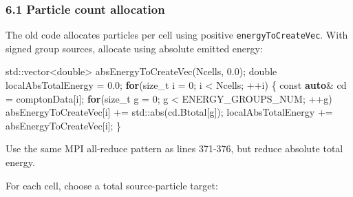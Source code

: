 \documentclass[
]{article}
\newenvironment{Shaded}{}{}
\newcommand{\AttributeTok}[1]{\textcolor[rgb]{0.49,0.56,0.16}{#1}}
\newcommand{\BuiltInTok}[1]{\textcolor[rgb]{0.00,0.50,0.00}{#1}}
\newcommand{\ControlFlowTok}[1]{\textcolor[rgb]{0.00,0.44,0.13}{\textbf{#1}}}
\newcommand{\DataTypeTok}[1]{\textcolor[rgb]{0.56,0.13,0.00}{#1}}
\newcommand{\DecValTok}[1]{\textcolor[rgb]{0.25,0.63,0.44}{#1}}
\newcommand{\FloatTok}[1]{\textcolor[rgb]{0.25,0.63,0.44}{#1}}
\newcommand{\KeywordTok}[1]{\textcolor[rgb]{0.00,0.44,0.13}{\textbf{#1}}}
\newcommand{\NormalTok}[1]{#1}
\newcommand{\OperatorTok}[1]{\textcolor[rgb]{0.40,0.40,0.40}{#1}}
\begin{document}
\subsubsection{6.1 Particle count
allocation}\label{particle-count-allocation}

The old code allocates particles per cell using positive
\texttt{energyToCreateVec}. With signed group sources, allocate using
absolute emitted energy:

\begin{Shaded}
\begin{Highlighting}[]
\BuiltInTok{std::}\NormalTok{vector}\OperatorTok{\textless{}}\DataTypeTok{double}\OperatorTok{\textgreater{}}\NormalTok{ absEnergyToCreateVec}\OperatorTok{(}\NormalTok{Ncells}\OperatorTok{,} \FloatTok{0.0}\OperatorTok{);}
\DataTypeTok{double}\NormalTok{ localAbsTotalEnergy }\OperatorTok{=} \FloatTok{0.0}\OperatorTok{;}
\ControlFlowTok{for}\OperatorTok{(}\DataTypeTok{size\_t}\NormalTok{ i }\OperatorTok{=} \DecValTok{0}\OperatorTok{;}\NormalTok{ i }\OperatorTok{\textless{}}\NormalTok{ Ncells}\OperatorTok{;} \OperatorTok{++}\NormalTok{i}\OperatorTok{)}
\OperatorTok{\{}
    \AttributeTok{const} \KeywordTok{auto}\OperatorTok{\&}\NormalTok{ cd }\OperatorTok{=}\NormalTok{ comptonData}\OperatorTok{[}\NormalTok{i}\OperatorTok{];}
    \ControlFlowTok{for}\OperatorTok{(}\DataTypeTok{size\_t}\NormalTok{ g }\OperatorTok{=} \DecValTok{0}\OperatorTok{;}\NormalTok{ g }\OperatorTok{\textless{}}\NormalTok{ ENERGY\_GROUPS\_NUM}\OperatorTok{;} \OperatorTok{++}\NormalTok{g}\OperatorTok{)}
\NormalTok{        absEnergyToCreateVec}\OperatorTok{[}\NormalTok{i}\OperatorTok{]} \OperatorTok{+=} \BuiltInTok{std::}\NormalTok{abs}\OperatorTok{(}\NormalTok{cd}\OperatorTok{.}\NormalTok{Btotal}\OperatorTok{[}\NormalTok{g}\OperatorTok{]);}
\NormalTok{    localAbsTotalEnergy }\OperatorTok{+=}\NormalTok{ absEnergyToCreateVec}\OperatorTok{[}\NormalTok{i}\OperatorTok{];}
\OperatorTok{\}}
\end{Highlighting}
\end{Shaded}

Use the same MPI all-reduce pattern as lines 371-376, but reduce
absolute total energy.

For each cell, choose a total source-particle target:
\end{document}
